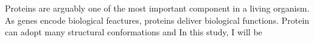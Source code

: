 Proteins are arguably one of the most important component in a living organism. As genes encode biological feactures, proteins deliver biological functions. Protein can adopt many structural conformations and   In this study, I will be 